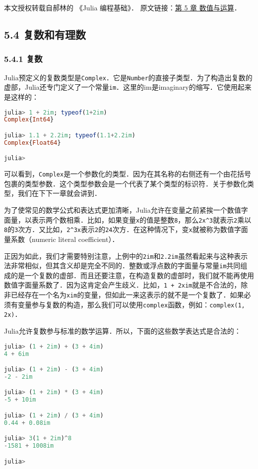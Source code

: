 
本文授权转载自郝林的 《Julia 编程基础》． 原文链接：\href{https://github.com/hyper0x/JuliaBasics/blob/master/book/ch05.md}{第 5 章 数值与运算}．


\subsection{5.4 复数和有理数}

\subsubsection{5.4.1 复数}

Julia预定义的复数类型是\verb|Complex|．它是\verb|Number|的直接子类型．为了构造出复数的虚部，Julia还专门定义了一个常量\verb|im|．这里的im是imaginary的缩写．它使用起来是这样的：
\begin{lstlisting}[language=julia]
julia> 1 + 2im; typeof(1+2im)
Complex{Int64}

julia> 1.1 + 2.2im; typeof(1.1+2.2im)
Complex{Float64}

julia> 
\end{lstlisting}

可以看到，\verb|Complex|是一个参数化的类型．因为在其名称的右侧还有一个由花括号包裹的类型参数．这个类型参数会是一个代表了某个类型的标识符．关于参数化类型，我们在下下一章就会讲到．

为了使常见的数学公式和表达式更加清晰，Julia允许在变量之前紧挨一个数值字面量，以表示两个数相乘．比如，如果变量\verb|x|的值是整数\verb|8|，那么\verb|2x^3|就表示\verb|2|乘以\verb|8|的\verb|3|次方．又比如，\verb|2^3x|表示\verb|2|的\verb|24|次方．在这种情况下，变\verb|x|就被称为数值字面量系数（numeric literal coefficient）．

正因为如此，我们才需要特别注意，上例中的\verb|2im|和\verb|2.2im|虽然看起来与这种表示法非常相似，但其含义却是完全不同的．整数或浮点数的字面量与常量\verb|im|共同组成的是一个复数的虚部．而且还要注意，在构造复数的虚部时，我们就不能再使用数值字面量系数了．因为这肯定会产生歧义．比如，\verb|1 + 2xim|就是不合法的，除非已经存在一个名为\verb|xim|的变量，但如此一来这表示的就不是一个复数了．如果必须有变量参与复数的构造，那么我们可以使用\verb|complex|函数，例如：\verb|complex(1, 2x)|．

Julia允许复数参与标准的数学运算．所以，下面的这些数学表达式是合法的：
\begin{lstlisting}[language=julia]
julia> (1 + 2im) + (3 + 4im)
4 + 6im

julia> (1 + 2im) - (3 + 4im)
-2 - 2im

julia> (1 + 2im) * (3 + 4im)
-5 + 10im

julia> (1 + 2im) / (3 + 4im)
0.44 + 0.08im

julia> 3(1 + 2im)^8
-1581 + 1008im

julia> 
\end{lstlisting}

